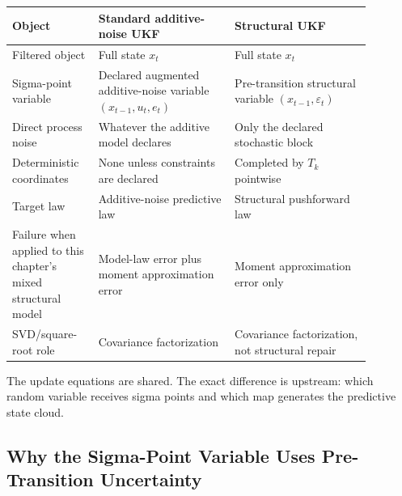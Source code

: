 \begin{center}
\begin{tabular}{p{0.20\linewidth}p{0.34\linewidth}p{0.34\linewidth}}
\toprule
\textbf{Object} & \textbf{Standard additive-noise UKF} & \textbf{Structural UKF}\\
\midrule
Filtered object & Full state $x_t$ & Full state $x_t$\\
Sigma-point variable & Declared augmented additive-noise variable
$(x_{t-1},u_t,e_t)$ & Pre-transition structural variable
$(x_{t-1},\varepsilon_t)$\\
Direct process noise & Whatever the additive model declares & Only the declared
stochastic block\\
Deterministic coordinates & None unless constraints are declared & Completed by
$T_k$ pointwise\\
Target law & Additive-noise predictive law & Structural pushforward law\\
Failure when applied to this chapter's mixed structural model & Model-law
error plus moment approximation error & Moment approximation error only\\
SVD/square-root role & Covariance factorization & Covariance factorization, not
structural repair\\
\bottomrule
\end{tabular}
\end{center}

The update equations are shared.  The exact difference is upstream: which
random variable receives sigma points and which map generates the predictive
state cloud.

\subsection{Why the Sigma-Point Variable Uses Pre-Transition Uncertainty}
\label{sec:bf-structural-ukf-proposition}

